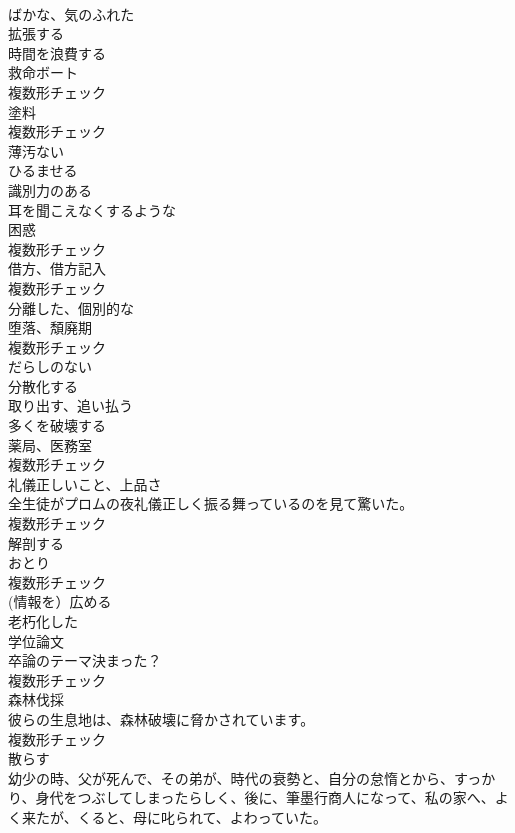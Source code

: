 \documentclass[8pt]{extreport}
\begin{document}
\begin{CJK}{UTF8}{min}
\\	[形容詞]	ばかな、気のふれた	
\\	[動詞]	拡張する	
\\	[動詞]	時間を浪費する	
\\	[名詞]	救命ボート	
\\	複数形チェック
\\	[名詞]	塗料	
\\	複数形チェック
\\	[形容詞]	薄汚ない	
\\	[動詞]	ひるませる	
\\	[形容詞]	識別力のある	
\\	[形容詞]	耳を聞こえなくするような	
\\	[名詞]	困惑	
\\	複数形チェック
\\	[名詞]	借方、借方記入	
\\	複数形チェック
\\	[形容詞]	分離した、個別的な	
\\	[名詞]	堕落、頽廃期	
\\	複数形チェック
\\	[形容詞]	だらしのない	
\\	[動詞]	分散化する	
\\	[動詞]	取り出す、追い払う	
\\	[動詞]	多くを破壊する	
\\	[名詞]	薬局、医務室	
\\	複数形チェック
\\	[名詞]	礼儀正しいこと、上品さ	
\\	全生徒がプロムの夜礼儀正しく振る舞っているのを見て驚いた。	
\\	複数形チェック
\\	[動詞]	解剖する	
\\	[名詞]	おとり	
\\	複数形チェック
\\	[動詞]	(情報を）広める	
\\	[形容詞]	老朽化した	
\\	[名詞]	学位論文	
\\	卒論のテーマ決まった？	
\\	複数形チェック
\\	[名詞]	森林伐採	
\\	彼らの生息地は、森林破壊に脅かされています。	
\\	複数形チェック
\\	[動詞]	散らす	
\\	幼少の時、父が死んで、その弟が、時代の衰勢と、自分の怠惰とから、すっかり、身代をつぶしてしまったらしく、後に、筆墨行商人になって、私の家へ、よく来たが、くると、母に叱られて、よわっていた。	

\end{CJK}
\end{document}
